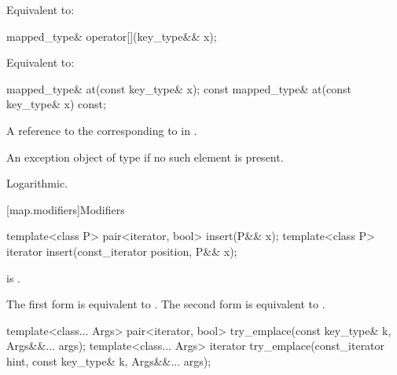 \begin{itemdescr}
\pnum
\effects
Equivalent to: 
\end{itemdescr}

%
\begin{itemdecl}
mapped_type& operator[](key_type&& x);
\end{itemdecl}

\begin{itemdescr}
\pnum
\effects
Equivalent to: 
\end{itemdescr}

%
\begin{itemdecl}
mapped_type&       at(const key_type& x);
const mapped_type& at(const key_type& x) const;
\end{itemdecl}

\begin{itemdescr}
\pnum
\returns
A reference to the  corresponding to  in .

\pnum
\throws
An exception object of type  if
no such element is present.

\pnum
\complexity
Logarithmic.
\end{itemdescr}

[map.modifiers]{Modifiers}

%
\begin{itemdecl}
template<class P>
  pair<iterator, bool> insert(P&& x);
template<class P>
  iterator insert(const_iterator position, P&& x);
\end{itemdecl}

\begin{itemdescr}
\pnum
\constraints
{} is .

\pnum
\effects
The first form is equivalent to
. The second form is
equivalent to .
\end{itemdescr}

%
\begin{itemdecl}
template<class... Args>
  pair<iterator, bool> try_emplace(const key_type& k, Args&&... args);
template<class... Args>
  iterator try_emplace(const_iterator hint, const key_type& k, Args&&... args);
\end{itemdecl}

